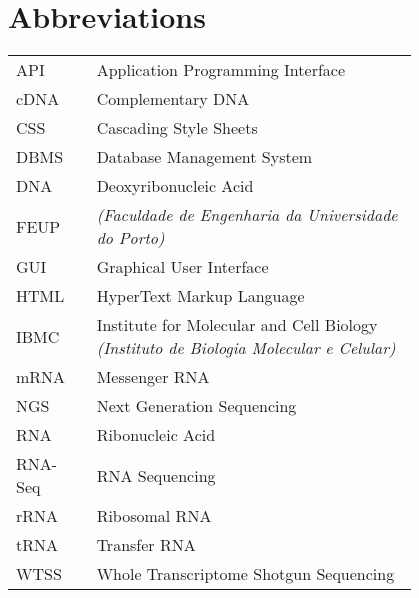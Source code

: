 \chapter*{Abbreviations}

\begin{flushleft}
\begin{tabular}{l p{0.8\linewidth}}
API       & Application Programming Interface\\
cDNA      & Complementary DNA\\
CSS       & Cascading Style Sheets\\
DBMS      & Database Management System\\
DNA       & Deoxyribonucleic Acid\\
FEUP      & \Feup{} \textit{(Faculdade de Engenharia da Universidade do Porto)}\\
GUI       & Graphical User Interface\\
HTML      & HyperText Markup Language\\
IBMC      & Institute for Molecular and Cell Biology \textit{(Instituto de Biologia Molecular e Celular)}\\
mRNA      & Messenger RNA\\
NGS       & Next Generation Sequencing\\
RNA       & Ribonucleic Acid\\
RNA-Seq   & RNA Sequencing\\
rRNA      & Ribosomal RNA\\
tRNA      & Transfer RNA\\
WTSS      & Whole Transcriptome Shotgun Sequencing\\
\end{tabular}
\end{flushleft}


